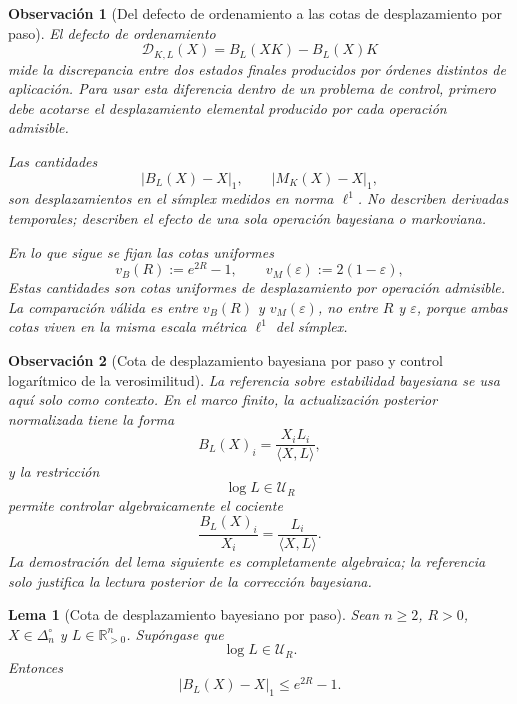 \documentclass[12pt]{article}
\newtheorem{lema}{Lema}[section]
\newtheorem{observacion}{Observación}[section]
\begin{document}
\begin{observacion}[Del defecto de ordenamiento a las cotas de desplazamiento por paso]
\label{obs:defecto_a_cotas_desplazamiento}
El defecto de ordenamiento
\[
\mathcal D_{K,L}(X)=B_L(XK)-B_L(X)K
\]
mide la discrepancia entre dos estados finales producidos por órdenes distintos de aplicación. Para usar esta diferencia dentro de un problema de control, primero debe acotarse el desplazamiento elemental producido por cada operación admisible.

Las cantidades
\[
\left|B_L(X)-X\right|_1,
\qquad
\left|M_K(X)-X\right|_1,
\]
son desplazamientos en el símplex medidos en norma \(\ell^1\). No describen derivadas temporales; describen el efecto de una sola operación bayesiana o markoviana.

En lo que sigue se fijan las cotas uniformes
\[
v_B(R):=e^{2R}-1,
\qquad
v_M(\varepsilon):=2(1-\varepsilon),
\]
Estas cantidades son cotas uniformes de desplazamiento por operación admisible. La comparación válida es entre \(v_B(R)\) y \(v_M(\varepsilon)\), no entre \(R\) y \(\varepsilon\), porque ambas cotas viven en la misma escala métrica \(\ell^1\) del símplex.
\end{observacion}

\begin{observacion}[Cota de desplazamiento bayesiana por paso y control logarítmico de la verosimilitud]
La referencia sobre estabilidad bayesiana \citep{Sprungk2020} se usa aquí solo como contexto. En el marco finito, la actualización posterior normalizada tiene la forma
\[
B_L(X)_i
=
\frac{X_iL_i}{\langle X,L\rangle},
\]
y la restricción
\[
\log L\in\mathcal U_R
\]
permite controlar algebraicamente el cociente
\[
\frac{B_L(X)_i}{X_i}
=
\frac{L_i}{\langle X,L\rangle}.
\]
La demostración del lema siguiente es completamente algebraica; la referencia solo justifica la lectura posterior de la corrección bayesiana.
\end{observacion}

\begin{lema}[Cota de desplazamiento bayesiano por paso]\label{lem:cota_desplazamiento_bayesiano}
Sean \(n\ge2\), \(R>0\), \(X\in\Delta_n^\circ\) y \(L\in\mathbb R_{>0}^n\). Supóngase que
\[
\log L\in\mathcal U_R.
\]
Entonces
\[
\left|B_L(X)-X\right|_1
\le
e^{2R}-1.
\]
\end{lema}
\end{document}
